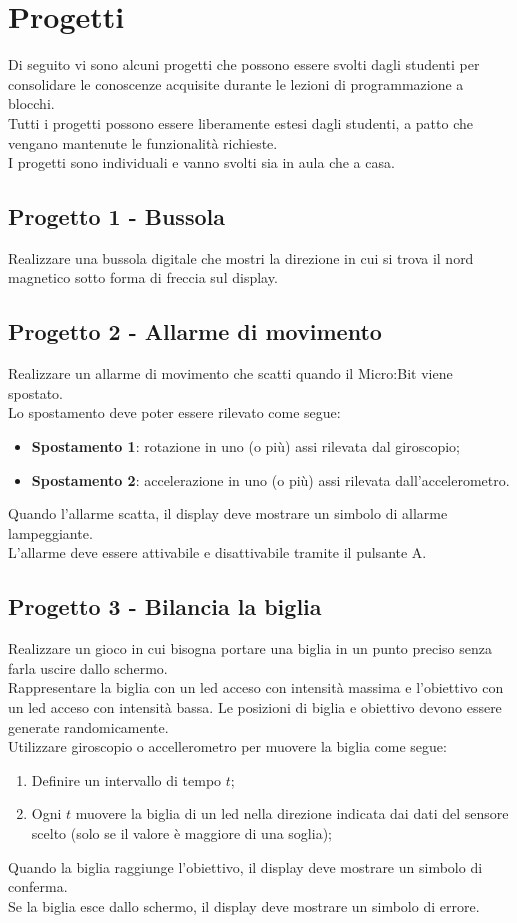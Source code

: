 \documentclass[../../docenti.tex]{subfiles}
\begin{document}
\section{Progetti}
Di seguito vi sono alcuni progetti che possono essere svolti dagli studenti per consolidare le conoscenze acquisite durante le lezioni di programmazione a blocchi.\\
Tutti i progetti possono essere liberamente estesi dagli studenti, a patto che vengano mantenute le funzionalità richieste.\\
I progetti sono individuali e vanno svolti sia in aula che a casa.
\subsection{Progetto 1 - Bussola}
Realizzare una bussola digitale che mostri la direzione in cui si trova il nord magnetico sotto forma di freccia sul display.

\subsection{Progetto 2 - Allarme di movimento}
Realizzare un allarme di movimento che scatti quando il Micro:Bit viene spostato.\\
Lo spostamento deve poter essere rilevato come segue:
\begin{itemize}
	\item \textbf{Spostamento 1}: rotazione in uno (o più) assi rilevata dal giroscopio;
	\item \textbf{Spostamento 2}: accelerazione in uno (o più) assi rilevata dall'accelerometro.
\end{itemize}
Quando l'allarme scatta, il display deve mostrare un simbolo di allarme lampeggiante.\\
L'allarme deve essere attivabile e disattivabile tramite il pulsante A.

\subsection{Progetto 3 - Bilancia la biglia}

Realizzare un gioco in cui bisogna portare una biglia in un punto preciso senza farla uscire dallo schermo.\\
Rappresentare la biglia con un led acceso con intensità massima e l'obiettivo con un led acceso con intensità bassa. Le posizioni di biglia e obiettivo devono essere generate randomicamente.\\
Utilizzare giroscopio o accellerometro per muovere la biglia come segue:
\begin{enumerate}
	\item Definire un intervallo di tempo \(t\);
	\item Ogni \(t\) muovere la biglia di un led nella direzione indicata dai dati del sensore scelto (solo se il valore è maggiore di una soglia);
\end{enumerate}
Quando la biglia raggiunge l'obiettivo, il display deve mostrare un simbolo di conferma.\\
Se la biglia esce dallo schermo, il display deve mostrare un simbolo di errore.	
\newpage
\end{document}
